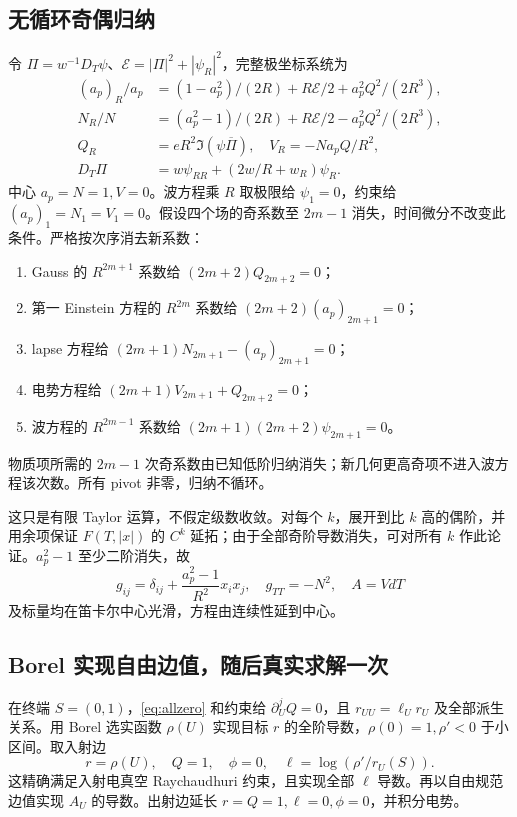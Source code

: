 \subsection{无循环奇偶归纳}
令 $\Pi=w^{-1}D_T\psi$、$\mathcal E=|\Pi|^2+|\psi_R|^2$，完整极坐标系统为
\begin{equation}\label{eq:polar}
\begin{split}
(a_p)_R/a_p&=(1-a_p^2)/(2R)+R\mathcal E/2+a_p^2Q^2/(2R^3),\\
N_R/N&=(a_p^2-1)/(2R)+R\mathcal E/2-a_p^2Q^2/(2R^3),\\
Q_R&=eR^2\Im(\psi\overline\Pi),\quad V_R=-Na_pQ/R^2,\\
D_T\Pi&=w\psi_{RR}+(2w/R+w_R)\psi_R.
\end{split}
\end{equation}
中心 $a_p=N=1,V=0$。波方程乘 $R$ 取极限给 $\psi_1=0$，约束给 $(a_p)_1=N_1=V_1=0$。假设四个场的奇系数至 $2m-1$ 消失，时间微分不改变此条件。严格按次序消去新系数：
\begin{enumerate}
\item Gauss 的 $R^{2m+1}$ 系数给 $(2m+2)Q_{2m+2}=0$；
\item 第一 Einstein 方程的 $R^{2m}$ 系数给 $(2m+2)(a_p)_{2m+1}=0$；
\item lapse 方程给 $(2m+1)N_{2m+1}-(a_p)_{2m+1}=0$；
\item 电势方程给 $(2m+1)V_{2m+1}+Q_{2m+2}=0$；
\item 波方程的 $R^{2m-1}$ 系数给 $(2m+1)(2m+2)\psi_{2m+1}=0$。
\end{enumerate}
物质项所需的 $2m-1$ 次奇系数由已知低阶归纳消失；新几何更高奇项不进入波方程该次数。所有 pivot 非零，归纳不循环。

这只是有限 Taylor 运算，不假定级数收敛。对每个 $k$，展开到比 $k$ 高的偶阶，并用余项保证 $F(T,|x|)$ 的 $C^k$ 延拓；由于全部奇阶导数消失，可对所有 $k$ 作此论证。$a_p^2-1$ 至少二阶消失，故
\[
g_{ij}=\delta_{ij}+\frac{a_p^2-1}{R^2}x_ix_j,
\quad g_{TT}=-N^2,\quad A=VdT
\]
及标量均在笛卡尔中心光滑，方程由连续性延到中心。

\subsection{Borel 实现自由边值，随后真实求解一次}
在终端 $S=(0,1)$，\eqref{eq:allzero} 和约束给 $\partial_U^jQ=0$，且 $r_{UU}=\ell_Ur_U$ 及全部派生关系。用 Borel 选实函数 $\rho(U)$ 实现目标 $r$ 的全阶导数，$\rho(0)=1,\rho'<0$ 于小区间。取入射边
\[
r=\rho(U),\quad Q=1,\quad\phi=0,
\quad\ell=\log(\rho'/r_U(S)).
\]
这精确满足入射电真空 Raychaudhuri 约束，且实现全部 $\ell$ 导数。再以自由规范边值实现 $A_U$ 的导数。出射边延长 $r=Q=1,\ell=0,\phi=0$，并积分电势。

